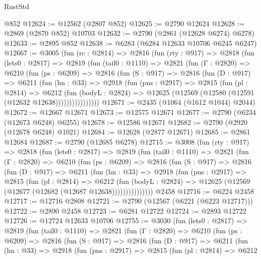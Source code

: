 \begin{lexlean}{RustStd}
\begin{coremodule}
    @852
@12624 := @12562 (@2807 @852)
@12625 := @2790 @12624
@12628 := @2869 (@2870 @852) @10703
@12632 := @2790 (@2861 (@12628 @6274) @6278)
@12633 := @2895 @852
@12638 := @6283 (@6284 @12633 @10706 @6245 @6247)
@12667 := @3005
    (fun (rc : @2814) =>
    @2816
      (fun (rty : @917) =>
      @2818
        (fun (lets0 : @2817) =>
        @2819
          (fun (tail0 : @1110) =>
          @2821
            (fun (Γ : @2820) =>
            @6210
              (fun (ps : @6209) =>
              @2816
                (fun (S : @917) =>
                @2816
                  (fun (D : @917) =>
                  @6211
                    (fun (hn : @33) =>
                    @2918
                      (fun (pns : @2917) =>
                      @2815
                        (fun (pl : @2814) =>
                        @6212
                          (fun (bodyL : @2824) =>
                          @12625 (@12569 (@12580 (@12591 (@12632 @12638))))))))))))))))
@12671 := @2435 (@1064 (@1612 @1044) @2044)
@12672 := @12667 @12671
@12673 := @12575 @12671
@12677 := @2790 (@6234 (@12673 @6248) @6255)
@12678 := @12586 @12671
@12682 := @2790 (@2920 (@12678 @6248) @1021)
@12684 := @12628 (@2877 @12671)
@12685 := @2861 @12684
@12687 := @2790 (@12685 @6278)
@12715 := @3008
    (fun (rty : @917) =>
    @2818
      (fun (lets0 : @2817) =>
      @2819
        (fun (tail0 : @1110) =>
        @2821
          (fun (Γ : @2820) =>
          @6210
            (fun (ps : @6209) =>
            @2816
              (fun (S : @917) =>
              @2816
                (fun (D : @917) =>
                @6211
                  (fun (hn : @33) =>
                  @2918
                    (fun (pns : @2917) =>
                    @2815
                      (fun (pl : @2814) =>
                      @6212
                        (fun (bodyL : @2824) =>
                        @12625 (@12569 (@12677 (@12682 (@12687 @12638)))))))))))))))
    @2458
@12716 := @6224 @2458
@12717 := @12716 @2808
@12721 := @2790 (@12567 (@6221 (@6223 @12717)))
@12722 := @2890 @2458
@12723 := @6281 @12722
@12724 := @2893 @12722
@12726 := @12724 @12633 @10706
@12755 := @3030
    (fun (lets0 : @2817) =>
    @2819
      (fun (tail0 : @1110) =>
      @2821
        (fun (Γ : @2820) =>
        @6210
          (fun (ps : @6209) =>
          @2816
            (fun (S : @917) =>
            @2816
              (fun (D : @917) =>
              @6211
                (fun (hn : @33) =>
                @2918
                  (fun (pns : @2917) =>
                  @2815
                    (fun (pl : @2814) =>
                    @6212

\end{coremodule}
\end{lexlean}
